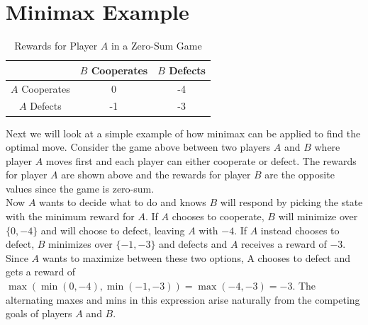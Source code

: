 \documentclass[12pt, letterpaper]{article}
\begin{document}
\section*{Minimax Example}
\begin{table}[H]
\begin{center}
\begin{tabular}{|c|c|c|}
    \hline
    & $B$ Cooperates & $B$ Defects \\
    \hline
    $A$ Cooperates & 0 & -4 \\
    \hline
    $A$ Defects & -1 & -3 \\
    \hline
\end{tabular}
\end{center}
\caption{Rewards for Player $A$ in a Zero-Sum Game}
\end{table}
Next we will look at a simple example of how minimax can be applied to find the optimal move. Consider the game above between two players $A$ and $B$ where player $A$ moves first and each player can either cooperate or defect. The rewards for player $A$ are shown above and the rewards for player $B$ are the opposite values since the game is zero-sum. \\[0.2cm]
Now $A$ wants to decide what to do and knows $B$ will respond by picking the state with the minimum reward for $A$. If $A$ chooses to cooperate, $B$ will minimize over $\{0, -4\}$ and will choose to defect, leaving $A$ with $-4$. If $A$ instead chooses to defect, $B$ minimizes over $\{-1, -3\}$ and defects and $A$ receives a reward of $-3$. Since $A$ wants to maximize between these two options, A chooses to defect and gets a reward of $\max(\min(0, -4), \min(-1, -3)) = \max(-4, -3) = -3$. The alternating maxes and mins in this expression arise naturally from the competing goals of players $A$ and $B$.
\end{document}
